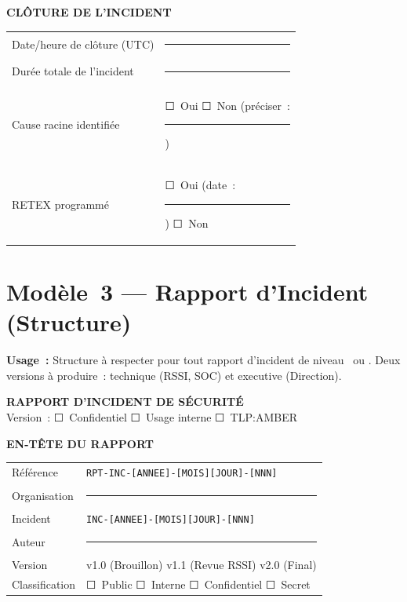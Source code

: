 \textbf{CLÔTURE DE L'INCIDENT}

\begin{table}[H]\centering\small{}
\begin{tabular}{p{5cm}p{8.5cm}}
\toprule
Date/heure de clôture (UTC) & \rule{8.5cm}{0.4pt} \\
Durée totale de l'incident & \rule{8.5cm}{0.4pt} \\
Cause racine identifiée & ☐~Oui \quad ☐~Non (préciser~: \rule{3.5cm}{0.4pt}) \\
RETEX programmé & ☐~Oui (date~: \rule{4cm}{0.4pt}) \quad ☐~Non \\
\bottomrule
\end{tabular}
\end{table}

\clearpage

\section{Modèle~3 — Rapport d'Incident (Structure)}
\label{ann:tpl-rapport}

\begin{boxinfo}
\textbf{Usage~:} Structure à respecter pour tout rapport d'incident
de niveau~ ou . Deux versions à produire~:
technique (RSSI, SOC) et executive (Direction).
\end{boxinfo}

\medskip
\begin{center}
{\large\bfseries\color{CouleurPrimaire}
RAPPORT D'INCIDENT DE SÉCURITÉ}\\[0.3ex]
{\small\color{CouleurBordInfo} Version~: ☐~Confidentiel \quad
☐~Usage interne \quad ☐~TLP:AMBER}
\end{center}

\textbf{EN-TÊTE DU RAPPORT}

\begin{table}[H]\centering\small{}
\begin{tabular}{p{4cm}p{9.5cm}}
\toprule
Référence & \texttt{RPT-INC-[ANNEE]-[MOIS][JOUR]-[NNN]} \\
Organisation & \rule{9.5cm}{0.4pt} \\
Incident & \texttt{INC-[ANNEE]-[MOIS][JOUR]-[NNN]} \\
Auteur & \rule{9.5cm}{0.4pt} \\
Version & v1.0 (Brouillon) \quad v1.1 (Revue RSSI) \quad v2.0 (Final) \\
Classification & ☐~Public \quad ☐~Interne \quad ☐~Confidentiel \quad ☐~Secret \\
\bottomrule
\end{tabular}
\end{table}

